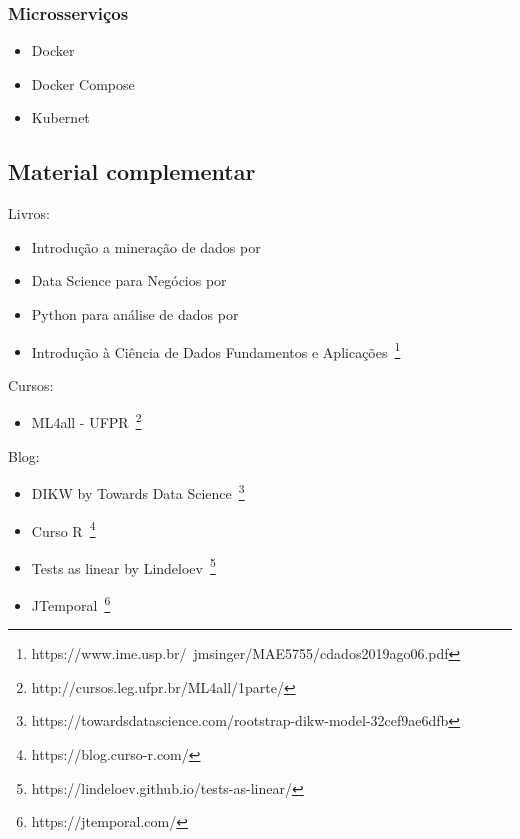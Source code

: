 \subsubsection*{Microsserviços}
\begin{itemize}	
	\item Docker
	\item Docker Compose
	\item Kubernet
\end{itemize}


\subsection{Material complementar}

Livros:
\begin{itemize}
	\item Introdução a mineração de dados por~
	\item Data Science para Negócios por~
	\item Python para análise de dados por~
	\item Introdução à Ciência de Dados Fundamentos e Aplicações~\footnote{https://www.ime.usp.br/~jmsinger/MAE5755/cdados2019ago06.pdf}
\end{itemize}


Cursos:
\begin{itemize}
	\item ML4all - UFPR~\footnote{http://cursos.leg.ufpr.br/ML4all/1parte/}
\end{itemize}


Blog:
\begin{itemize}
	\item DIKW by Towards Data Science~\footnote{https://towardsdatascience.com/rootstrap-dikw-model-32cef9ae6dfb}
	\item Curso R~\footnote{https://blog.curso-r.com/}
	\item Tests as linear by Lindeloev~\footnote{https://lindeloev.github.io/tests-as-linear/}
	\item JTemporal~\footnote{https://jtemporal.com/}
\end{itemize}


